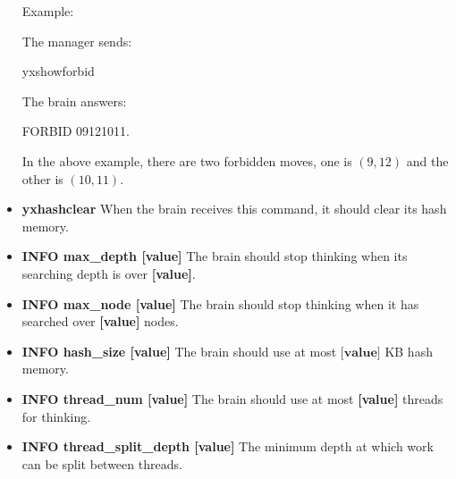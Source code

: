 \documentclass[a4paper,12pt]{article}
\begin{document}
\begin{itemize}
Example: 

The manager sends:

\fbox
{
yxshowforbid
}

The brain answers:

\fbox
{
FORBID 09121011.
}

In the above example, there are two forbidden moves, one is $(9,12)$ and the other is $(10,11)$.

\item \textbf{yxhashclear}
When the brain receives this command, it should clear its hash memory.

\item \textbf{INFO max\_depth [value]}
The brain should stop thinking when its searching depth is over \textbf{[value]}.
\item \textbf{INFO max\_node [value]}
The brain should stop thinking when it has searched over \textbf{[value]} nodes. %
\item \textbf{INFO hash\_size [value]}
The brain should use at most $\textbf{[value]}$ KB hash memory.
\item \textbf{INFO thread\_num [value]}
The brain should use at most \textbf{[value]} threads for thinking.
\item \textbf{INFO thread\_split\_depth [value]}
The minimum depth at which work can be split between threads.
\end{itemize}



\end{document}
